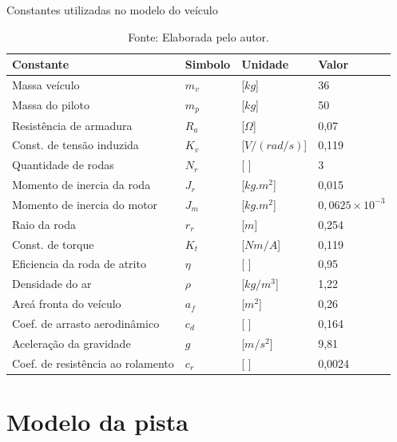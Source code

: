 \begin{table}[H]
	\centering
	\caption{Constantes utilizadas no modelo do veículo}
	\begin{tabular}{llll}
		\toprule
		\textbf{Constante} & \textbf{Simbolo} & \textbf{Unidade} & \textbf{Valor}\\
		\hline
		Massa veículo                       & $m_v$  & [$kg$]              & 36      \\
        Massa do piloto                     & $m_p$  & [$kg$]              & 50      \\
        Resistência de armadura             & $R_a$  & [$\Omega$]        & 0,07    \\  
        Const. de tensão induzida           & $K_v$  & [$V/(rad/s)$]       & 0,119   \\
        Quantidade de rodas                 & $N_r$  & [ ]                & 3       \\
        Momento de inercia da roda          & $J_r$  & [$kg.m^2$]        & 0,015   \\
        Momento de inercia do motor         & $J_m$  & [$kg.m^2$]        & $0,0625 \times 10^{-3}$\\
        Raio da roda                        & $r_r$  & [$m$]               & 0,254   \\
        Const. de torque                    & $K_t$  & [$Nm/A$]            & 0,119   \\
        Eficiencia da roda de atrito        & $\eta$ & [ ]                & 0,95    \\
        Densidade do ar                     & $\rho$ & [$kg/m^3$]        & 1,22    \\
        Areá fronta do veículo              & $a_f$  & [$m^2$]           & 0,26    \\
        Coef. de arrasto aerodinâmico       & $c_d$  & [ ]                & 0,164   \\
        Aceleração da gravidade             & $g$    & [$m/s^2$]         & 9,81    \\
        Coef. de resistência ao rolamento   & $c_r$  & [ ]                & 0,0024  \\
		\bottomrule
	\end{tabular}
	\caption*{\footnotesize Fonte: Elaborada pelo autor.}
	\label{tab:constantes}
\end{table}


\section{Modelo da pista}

